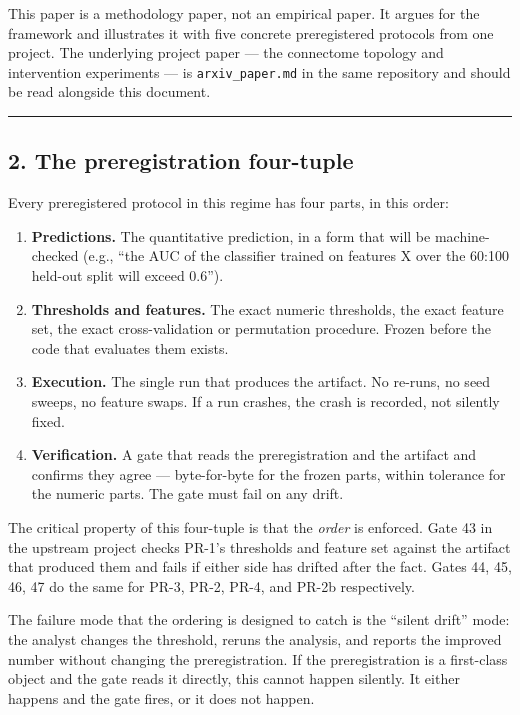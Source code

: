 \documentclass[
]{article}
\providecommand{\tightlist}{%
  \setlength{\itemsep}{0pt}\setlength{\parskip}{0pt}}
\begin{document}
This paper is a methodology paper, not an empirical paper. It argues for
the framework and illustrates it with five concrete preregistered
protocols from one project. The underlying project paper --- the
connectome topology and intervention experiments --- is
\texttt{arxiv\_paper.md} in the same repository and should be read
alongside this document.

\begin{center}\rule{0.5\linewidth}{0.5pt}\end{center}

\subsection{2. The preregistration
four-tuple}\label{the-preregistration-four-tuple}

Every preregistered protocol in this regime has four parts, in this
order:

\begin{enumerate}
\def\labelenumi{\arabic{enumi}.}
\tightlist
\item
  \textbf{Predictions.} The quantitative prediction, in a form that will
  be machine-checked (e.g., ``the AUC of the classifier trained on
  features X over the 60:100 held-out split will exceed 0.6'').
\item
  \textbf{Thresholds and features.} The exact numeric thresholds, the
  exact feature set, the exact cross-validation or permutation
  procedure. Frozen before the code that evaluates them exists.
\item
  \textbf{Execution.} The single run that produces the artifact. No
  re-runs, no seed sweeps, no feature swaps. If a run crashes, the crash
  is recorded, not silently fixed.
\item
  \textbf{Verification.} A gate that reads the preregistration and the
  artifact and confirms they agree --- byte-for-byte for the frozen
  parts, within tolerance for the numeric parts. The gate must fail on
  any drift.
\end{enumerate}

The critical property of this four-tuple is that the \emph{order} is
enforced. Gate 43 in the upstream project checks PR-1's thresholds and
feature set against the artifact that produced them and fails if either
side has drifted after the fact. Gates 44, 45, 46, 47 do the same for
PR-3, PR-2, PR-4, and PR-2b respectively.

The failure mode that the ordering is designed to catch is the ``silent
drift'' mode: the analyst changes the threshold, reruns the analysis,
and reports the improved number without changing the preregistration. If
the preregistration is a first-class object and the gate reads it
directly, this cannot happen silently. It either happens and the gate
fires, or it does not happen.
\end{document}
